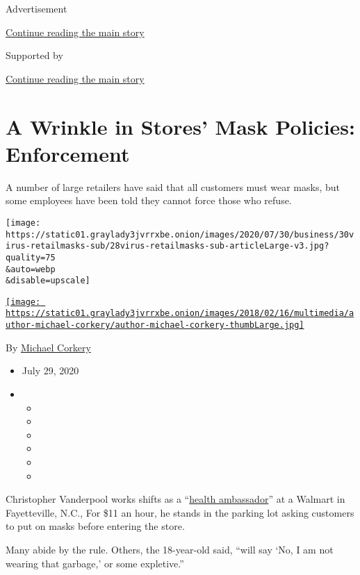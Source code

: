 Advertisement

\protect\hyperlink{after-top}{Continue reading the main story}

Supported by

\protect\hyperlink{after-sponsor}{Continue reading the main story}

\hypertarget{a-wrinkle-in-stores-mask-policies-enforcement}{%
\section{A Wrinkle in Stores' Mask Policies:
Enforcement}\label{a-wrinkle-in-stores-mask-policies-enforcement}}

A number of large retailers have said that all customers must wear
masks, but some employees have been told they cannot force those who
refuse.

\texttt{[image: https://static01.graylady3jvrrxbe.onion/images/2020/07/30/business/30virus-retailmasks-sub/28virus-retailmasks-sub-articleLarge-v3.jpg?quality=75\\\&auto=webp\\\&disable=upscale]}

\href{https://www.nytimes3xbfgragh.onion/by/michael-corkery}{\texttt{[image: https://static01.graylady3jvrrxbe.onion/images/2018/02/16/multimedia/author-michael-corkery/author-michael-corkery-thumbLarge.jpg]}}

By \href{https://www.nytimes3xbfgragh.onion/by/michael-corkery}{Michael
Corkery}

\begin{itemize}
\item
  July 29, 2020
\item
  \begin{itemize}
  \item
  \item
  \item
  \item
  \item
  \item
  \end{itemize}
\end{itemize}

Christopher Vanderpool works shifts as a
``\href{https://www.nytimes3xbfgragh.onion/2020/07/15/business/walmart-requiring-masks.html?searchResultPosition=1}{health
ambassador}'' at a Walmart in Fayetteville, N.C., For \$11 an hour, he
stands in the parking lot asking customers to put on masks before
entering the store.

Many abide by the rule. Others, the 18-year-old said, ``will say `No, I
am not wearing that garbage,' or some expletive.''

